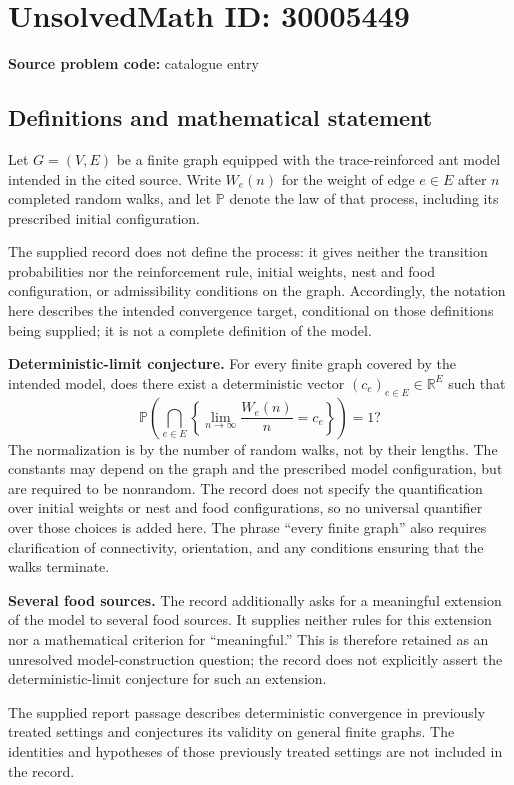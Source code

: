 \documentclass[11pt]{article}
\newcommand{\R}{\mathbb{R}}
\begin{document}
\section*{UnsolvedMath ID: 30005449}
\textbf{Source problem code:} catalogue entry
\subsection{Definitions and mathematical statement}
Let \(G=(V,E)\) be a finite graph equipped with the trace-reinforced ant model intended in the cited source. Write \(W_e(n)\) for the weight of edge \(e\in E\) after \(n\) completed random walks, and let \(\mathbb P\) denote the law of that process, including its prescribed initial configuration.

The supplied record does not define the process: it gives neither the transition probabilities nor the reinforcement rule, initial weights, nest and food configuration, or admissibility conditions on the graph. Accordingly, the notation here describes the intended convergence target, conditional on those definitions being supplied; it is not a complete definition of the model.

\textbf{Deterministic-limit conjecture.} For every finite graph covered by the intended model, does there exist a deterministic vector \((c_e)_{e\in E}\in\R^E\) such that
\[
\mathbb P\!\left(\bigcap_{e\in E}\left\{\lim_{n\to\infty}\frac{W_e(n)}{n}=c_e\right\}\right)=1?
\]
The normalization is by the number of random walks, not by their lengths. The constants may depend on the graph and the prescribed model configuration, but are required to be nonrandom. The record does not specify the quantification over initial weights or nest and food configurations, so no universal quantifier over those choices is added here. The phrase ``every finite graph'' also requires clarification of connectivity, orientation, and any conditions ensuring that the walks terminate.

\textbf{Several food sources.} The record additionally asks for a meaningful extension of the model to several food sources. It supplies neither rules for this extension nor a mathematical criterion for ``meaningful.'' This is therefore retained as an unresolved model-construction question; the record does not explicitly assert the deterministic-limit conjecture for such an extension.

The supplied report passage describes deterministic convergence in previously treated settings and conjectures its validity on general finite graphs. The identities and hypotheses of those previously treated settings are not included in the record.
\end{document}
